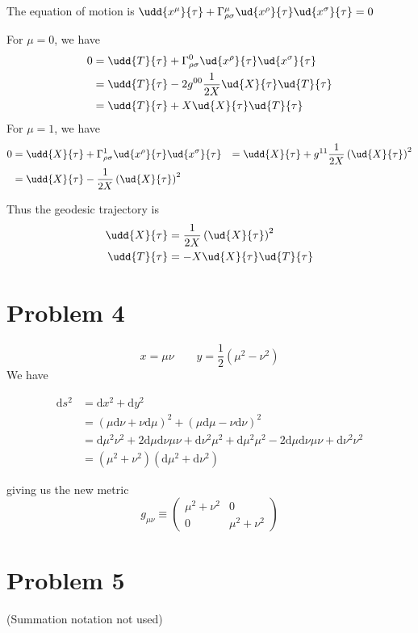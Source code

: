 \documentclass[12pt]{article}
\begin{document}
The equation of motion is $\udd{x^\mu}{\tau}+\Gamma^\mu_{\rho\sigma}\ud{x^\rho}{\tau}\ud{x^\sigma}{\tau}=0$

For $\mu=0$, we have \begin{align*}0&=\udd{T}{\tau}+\Gamma^0_{\rho\sigma}\ud{x^\rho}{\tau}\ud{x^\sigma}{\tau}\\
&=\udd{T}{\tau}-2g^{00}\frac1{2X}\ud{X}{\tau}\ud{T}{\tau}\\
&=\udd{T}{\tau}+X\ud{X}{\tau}\ud{T}{\tau}
\end{align*}
For $\mu=1$, we have \begin{align*}0&=\udd{X}{\tau}+\Gamma^1_{\rho\sigma}\ud{x^\rho}{\tau}\ud{x^\sigma}{\tau}
&= \udd{X}{\tau} + g^{11}\frac1{2X}\left(\ud{X}{\tau}\right)^2\\
&= \udd{X}{\tau} - \frac1{2X}\left(\ud{X}{\tau}\right)^2
\end{align*}

Thus the geodesic trajectory is \begin{align*}
\udd{X}{\tau} &=\frac1{2X}\left(\ud{X}{\tau}\right)^2\\
\udd{T}{\tau}&=-X\ud{X}{\tau}\ud{T}{\tau}
\end{align*}

\section*{Problem 4}
$$x=\mu\nu\qquad y=\frac12(\mu^2-\nu^2)$$
\newcommand{\dd}{\mathrm{d}}
We have 

\begin{align*}
\dd s^2&=\dd x^2+\dd y^2\\
&=(\mu\dd\nu +\nu \dd\mu)^2 + (\mu\dd\mu-\nu\dd\nu)^2\\
&=\dd\mu ^2 \nu ^2+2 \dd\mu \dd\nu \mu  \nu +\dd \nu^2 \mu ^2 + \dd\mu^2 \mu ^2-2\dd\mu\dd\nu \mu  \nu +\dd\nu^2 \nu ^2\\
&=(\mu^2+\nu^2)(\dd\mu^2+\dd\nu^2)
\end{align*}

giving us the new metric $$g_{\mu\nu}\equiv\begin{pmatrix}
\mu^2+\nu^2 & 0\\
0 & \mu^2+\nu^2
\end{pmatrix}$$

\section*{Problem 5}

(Summation notation not used)
\end{document}
